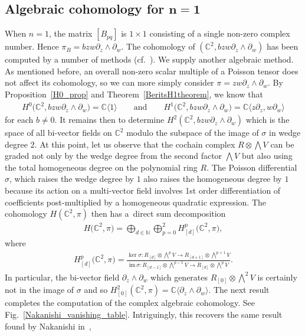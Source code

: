 \documentclass[pdftex]{sigma}
\numberwithin{equation}{section}
\begin{document}
\subsection[Algebraic cohomology for $n=1$]{Algebraic cohomology for $\boldsymbol{n=1}$} When $n=1$, the matrix $[B_{pq}]$ is $1\times 1$ consisting of a single non-zero complex number. Hence $\pi_B=bzw\partial_z\wedge\partial_w$. The cohomology of $({\mathbb C}^2,bzw\partial_z\wedge\partial_w)$ has been computed by a number of methods (cf.~\cite{Goto,Monnier2}). We supply another algebraic method. As mentioned before, an overall non-zero scalar multiple of a Poisson tensor does not af\/fect its cohomology, so we can more simply consider $\pi=zw\partial_z\wedge\partial_w$. By Proposition~\ref{H0_prop} and Theorem~\ref{BeritsH1theorem}, we know that
\begin{gather*}
H^0\big({\mathbb C}^2,bzw\partial_z\wedge\partial_w\big)={\mathbb C}\langle 1\rangle \qquad \text{and} \qquad H^1\big({\mathbb C}^2,bzw\partial_z\wedge\partial_w\big)={\mathbb C}\langle z\partial_z,w\partial_w\rangle
\end{gather*}
for each $b\not=0$. It remains then to determine $H^2({\mathbb C}^2,bzw\partial_z\wedge\partial_w)$ which is the space of all bi-vector f\/ields on ${\mathbb C}^2$ modulo the subspace of the image of $\sigma$ in wedge degree $2$. At this point, let us observe that the cochain complex $R\otimes \bigwedge V$ can be graded not only by the wedge degree from the second factor $\bigwedge V$ but also using the total homogeneous degree on the polynomial ring $R$. The Poisson dif\/ferential $\sigma$, which raises the wedge degree by $1$ also raises the homogeneous degree by $1$ because its action on a multi-vector f\/ield involves 1st order dif\/ferentiation of coef\/f\/icients post-multiplied by a homogeneous quadratic expression. The cohomology $H({\mathbb C}^2,\pi)$ then has a~direct sum decomposition
\begin{gather*}
H\big({\mathbb C}^2,\pi\big)=\bigoplus_{d\in\mathbb N} \bigoplus_{p=0}^2 H^p_{[d]}\big({\mathbb C}^2,\pi\big),
\end{gather*}
where
\begin{gather*}
H^p_{[d]}\big({\mathbb C}^2,\pi\big)=\frac{\ker \sigma\colon R_{[d]}\otimes \bigwedge^p V\to R_{[d+1]}\otimes \bigwedge^{p+1} V}{\mathrm{im}\,\sigma\colon R_{[d-1]}\otimes \bigwedge^{p-1} V\to R_{[d]}\otimes \bigwedge^p V}.
\end{gather*}
In particular, the bi-vector f\/ield $\partial_z\wedge\partial_w$ which generates $R_{[0]}\otimes \bigwedge^2 V$ is certainly not in the image of $\sigma$ and so $H^2_{[0]}({\mathbb C}^2,\pi)={\mathbb C}\langle \partial_z\wedge\partial_w\rangle$. The next result completes the computation of the complex algebraic cohomology. See Fig.~\ref{Nakanishi_vanishing_table}. Intriguingly, this recovers the same result found by Nakanishi in~\cite{Nakanishi},
\end{document}
